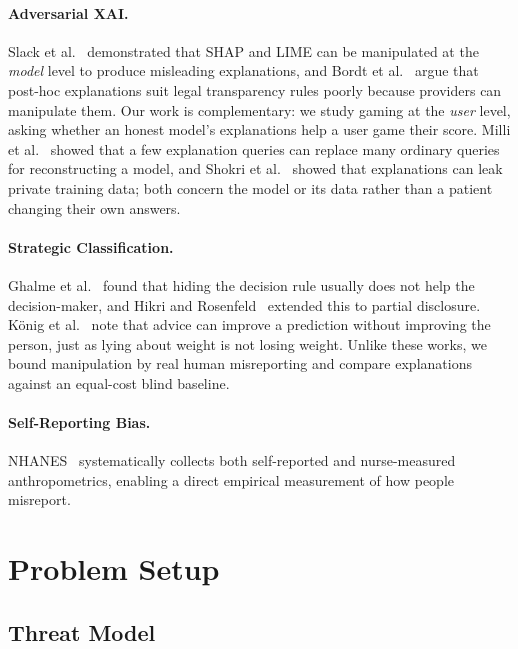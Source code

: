 \documentclass[sigconf,nonacm]{acmart}
\begin{document}
\paragraph{Adversarial XAI.}
Slack et al.~\cite{slack2020fooling} demonstrated that SHAP and LIME
can be manipulated at the \emph{model} level to produce misleading
explanations, and Bordt et al.~\cite{bordt2022posthoc} argue that
post-hoc explanations suit legal transparency rules poorly because
providers can manipulate them.  Our work is complementary: we study
gaming at the \emph{user} level, asking whether an honest model's
explanations help a user game their score.  Milli et
al.~\cite{milli2019model} showed that a few explanation queries can
replace many ordinary queries for reconstructing a model, and Shokri
et al.~\cite{shokri2021privacy} showed that explanations can leak
private training data; both concern the model or its data rather than
a patient changing their own answers.

\paragraph{Strategic Classification.}
Ghalme et al.~\cite{ghalme2021strategic} found that hiding the
decision rule usually does not help the decision-maker, and Hikri and
Rosenfeld~\cite{hikri2026ambiguous} extended this to partial
disclosure.  K\"{o}nig et al.~\cite{konig2023improvement} note that advice
can improve a prediction without improving the person, just as lying
about weight is not losing weight.  Unlike these works, we bound
manipulation by real human misreporting and compare explanations
against an equal-cost blind baseline.

\paragraph{Self-Reporting Bias.}
NHANES~\cite{johnson2014national} systematically collects both
self-reported and nurse-measured anthropometrics, enabling a direct
empirical measurement of how people misreport.

\section{Problem Setup}

\subsection{Threat Model}
\end{document}
